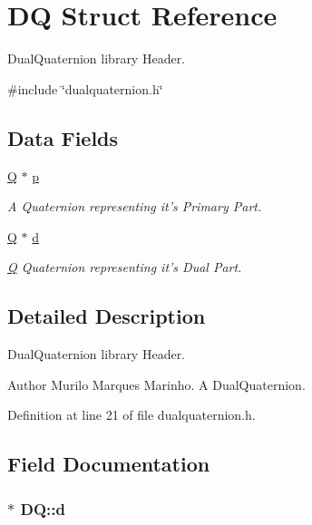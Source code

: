 \hypertarget{structDQ}{\section{D\-Q Struct Reference}
\label{structDQ}
}


Dual\-Quaternion library Header.  




{\ttfamily \#include \char`\"{}dualquaternion.\-h\char`\"{}}

\subsection*{Data Fields}
\begin{DoxyCompactItemize}
\item 
\hyperlink{structQ}{Q} $\ast$ \hyperlink{structDQ_a878210bff170f4392d6cbe2d4704ffdc}{p}
\begin{DoxyCompactList}\small\item\em A Quaternion representing it's Primary Part. \end{DoxyCompactList}\item 
\hyperlink{structQ}{Q} $\ast$ \hyperlink{structDQ_a535cdb52876521fd6abbfcf211a7c702}{d}
\begin{DoxyCompactList}\small\item\em \hyperlink{structQ}{Q} Quaternion representing it's Dual Part. \end{DoxyCompactList}\end{DoxyCompactItemize}


\subsection{Detailed Description}
Dual\-Quaternion library Header. 

\begin{DoxyAuthor}{Author}
Murilo Marques Marinho. A Dual\-Quaternion. 
\end{DoxyAuthor}


Definition at line 21 of file dualquaternion.\-h.



\subsection{Field Documentation}
\hypertarget{structDQ_a535cdb52876521fd6abbfcf211a7c702}{
\subsubsection[{d}]{$\ast$ D\-Q\-::d}}\label{structDQ_a535cdb52876521fd6abbfcf211a7c702}


